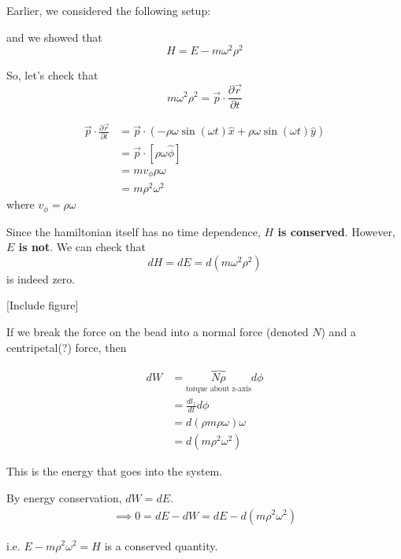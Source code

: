\documentclass[11pt]{article}
\begin{document}
\vskip 0.5cm
Earlier, we considered the following setup:

\vskip 0.5cm
and we showed that 
\[ H = E - m\omega^2 \rho^2 \]

So, let's check that 
\[ m\omega^2 \rho^2 = \vec{p} \cdot \frac{\partial \vec{r}}{\partial t} \]

\begin{bluebox}
\begin{align*}
  \vec{p} \cdot \frac{\partial \vec{r}}{\partial t} &= \vec{p} \cdot \left( -\rho \omega \sin(\omega t) \hat{x} + \rho \omega \sin(\omega t) \hat{y} \right) \\
  &= \vec{p} \cdot \left[ \rho  \omega \hat{\phi} \right] \\
  &= m v_{\phi} \rho \omega \\
  &= m \rho^2 \omega^2 
\end{align*}
where $v_{\phi} = \rho \omega$
\end{bluebox}

Since the hamiltonian itself has no time dependence, \textbf{$H$ is conserved}. However, \textbf{$E$ is not}. We can check that 
\[ dH = dE = d(m \omega^2 \rho^2) \] is indeed zero. 

\vskip 0.5cm
[Include figure]

\vskip 0.5cm
\begin{bluebox}
  If we break the force on the bead into a normal force (denoted $N$) and a centripetal(?) force, then

\begin{align*}
  dW &= \overbrace{N \rho}_{\text{torque about z-axis}} d\phi \\
  &= \frac{d {l}_z}{dt} d\phi \\
  &= d \left(\rho m \rho \omega\right) \omega \\
  &= d\left(m \rho^2 \omega^2\right)
\end{align*}

This is the energy that goes into the system.

\vskip 0.5cm
By energy conservation, $dW = dE$.
\begin{align*}
  \implies 0 = dE - dW = dE - d(m\rho^2 \omega^2)
\end{align*}

i.e. $E - m\rho^2 \omega^2 = H$ is a conserved quantity.
\end{bluebox}
\end{document}

